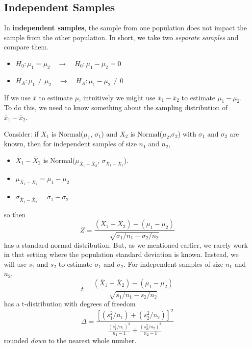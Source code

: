 \documentclass[
]{book}
\providecommand{\tightlist}{%
  \setlength{\itemsep}{0pt}\setlength{\parskip}{0pt}}
\begin{document}
\hypertarget{independent-samples}{%
\subsection{Independent Samples}\label{independent-samples}}

In \textbf{independent samples}, the sample from one population does not impact the sample from the other population. In short, we take two \emph{separate samples} and compare them.

\begin{itemize}
\tightlist
\item
  \(H_0: \mu_1 = \mu_2 \quad \rightarrow \quad H_0: \mu_1 - \mu_2 = 0\)
\item
  \(H_A: \mu_1 \ne \mu_2 \quad \rightarrow \quad H_A: \mu_1 - \mu_2 \ne 0\)
\end{itemize}

If we use \(\bar{x}\) to estimate \(\mu\), intuitively we might use \(\bar{x}_1-\bar{x}_2\) to estimate \(\mu_1 - \mu_2\). To do this, we need to know something about the sampling distribution of \(\bar{x}_1-\bar{x}_2\).

Consider: if \(X_1\) is Normal(\(\mu_1\), \(\sigma_1\)) and \(X_2\) is Normal(\(\mu_2\),\(\sigma_2\)) with \(\sigma_1\) and \(\sigma_2\) are known, then for independent samples of size \(n_1\) and \(n_2\),

\begin{itemize}
\tightlist
\item
  \(\bar{X}_1-\bar{X}_2\) is Normal(\(\mu_{\bar{X}_1-\bar{X}_2}\), \(\sigma_{\bar{X}_1-\bar{X}_2}\)).
\item
  \(\mu_{\bar{X}_1-\bar{X}_2} = \mu_1 - \mu_2\)
\item
  \(\sigma_{\bar{X}_1-\bar{X}_2} = \sigma_1 - \sigma_2\)
\end{itemize}

so then \[Z = \frac{(\bar{X}_1 - \bar{X}_2) - (\mu_1 - \mu_2)}{\sqrt{\sigma_1/n_1 - \sigma_2/n_2}}\] has a standard normal distribution. But, as we mentioned earlier, we rarely work in that setting where the population standard deviation is known. Instead, we will use \(s_1\) and \(s_2\) to estimate \(\sigma_1\) and \(\sigma_2\). For independent samples of size \(n_1\) and \(n_2\), \[t = \frac{(\bar{X}_1 - \bar{X}_2) - (\mu_1 - \mu_2)}{\sqrt{s_1/n_1 - s_2/n_2}}\] has a t-distribution with degrees of freedom \[\Delta = \frac{[(s_1^2/n_1) + (s_2^2/n_2)]^2}{\frac{(s_1^2/n_1)^2}{n_1-1} + \frac{(s_2^2/n_2)^2}{n_2-1}}\] rounded \emph{down} to the nearest whole number.
\end{document}
